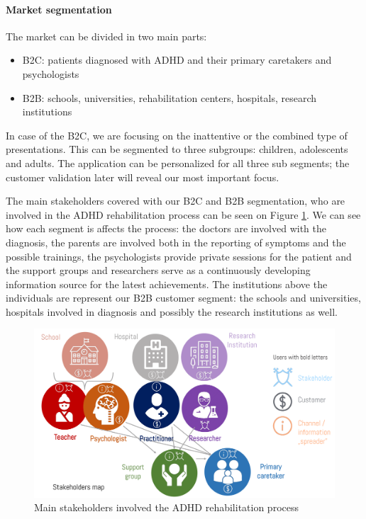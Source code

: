 \documentclass[letterpaper,10pt]{article}
\begin{document}
\paragraph{Market segmentation}

The market can be divided in two main parts:
\begin{itemize}
\item B2C:  patients diagnosed with ADHD  and their primary caretakers and psychologists
\item B2B: schools, universities, rehabilitation centers, hospitals, research institutions
\end{itemize}  

In case of the B2C, we are focusing on the inattentive or the combined type of presentations. This can be segmented to three subgroups: children, adolescents and adults. The application can be personalized for all three sub segments; the customer validation later will reveal our most important focus.

The main stakeholders covered with our B2C and B2B segmentation, who are involved in the ADHD rehabilitation process can be seen on Figure \ref{fig:stakeholders}. We can see how each segment is affects the process: the doctors are involved with the diagnosis, the parents are involved both in the reporting of symptoms and the possible trainings, the psychologists provide private sessions for the patient and the support groups and researchers serve as a continuously developing information source for the latest achievements. The institutions above the individuals are represent our B2B customer segment: the schools and universities, hospitals involved in diagnosis and possibly the research institutions as well.

\begin{figure}[h]
\centering
\includegraphics[scale=0.15]{stakeholder.png}
\caption{Main stakeholders involved the ADHD rehabilitation process}
\label{fig:stakeholders}
\end{figure}
 
\end{document}
